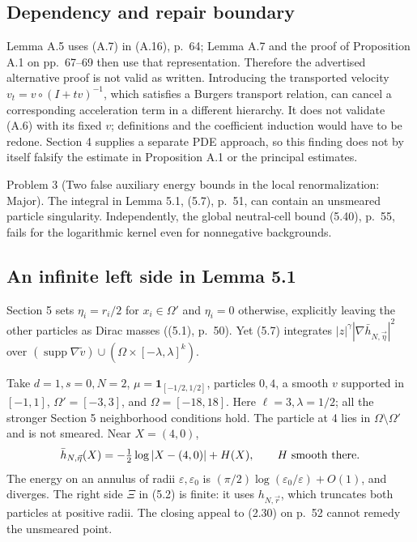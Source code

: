 \documentclass[10pt]{article}
\begin{document}
\subsection*{Dependency and repair boundary}
Lemma A.5 uses (A.7) in (A.16), p. 64; Lemma A.7 and the proof of Proposition A.1 on pp. 67–69 then use that representation. Therefore the advertised alternative proof is not valid as written. Introducing the transported velocity \(v_t=v\circ(I+tv)^{-1}\), which satisfies a Burgers transport relation, can cancel a corresponding acceleration term in a different hierarchy. It does not validate (A.6) with its fixed \(v\); definitions and the coefficient induction would have to be redone. Section 4 supplies a separate PDE approach, so this finding does not by itself falsify the estimate in Proposition A.1 or the principal estimates.\par
Problem 3 (Two false auxiliary energy bounds in the local renormalization: Major).  The integral in Lemma 5.1, (5.7), p. 51, can contain an unsmeared particle singularity. Independently, the global neutral-cell bound (5.40), p. 55, fails for the logarithmic kernel even for nonnegative backgrounds.\par
\subsection*{An infinite left side in Lemma 5.1}
Section 5 sets \(\eta_i=r_i/2\) for \(x_i\in\Omega'\) and \(\eta_i=0\) otherwise, explicitly leaving the other particles as Dirac masses ((5.1), p. 50). Yet (5.7) integrates \(|z|^\gamma|\nabla\bar h_{N,\vec\eta}|^2\) over \((\operatorname{supp}\nabla\widetilde v)\cup(\Omega\times[-\lambda,\lambda]^k)\).\par
Take \(d=1,s=0,N=2\), \(\mu=\mathbf1_{[-1/2,1/2]}\), particles \(0,4\), a smooth \(v\) supported in \([-1,1]\), \(\Omega'=[-3,3]\), and \(\Omega=[-18,18]\). Here \(\ell=3,\lambda=1/2\); all the stronger Section 5 neighborhood conditions hold. The particle at 4 lies in \(\Omega\setminus\Omega'\) and is not smeared. Near \(X=(4,0)\), \[\bar h_{N,\vec\eta}(X)=-\tfrac12\log|X-(4,0)|+H(X),
 \qquad H\ \hbox{smooth there}.\] The energy on an annulus of radii \(\varepsilon,\varepsilon_0\) is \((\pi/2)\log(\varepsilon_0/\varepsilon)+O(1)\), and diverges. The right side \(\Xi\) in (5.2) is finite: it uses \(h_{N,\vec r}\), which truncates both particles at positive radii. The closing appeal to (2.30) on p. 52 cannot remedy the unsmeared point.\par
\end{document}
